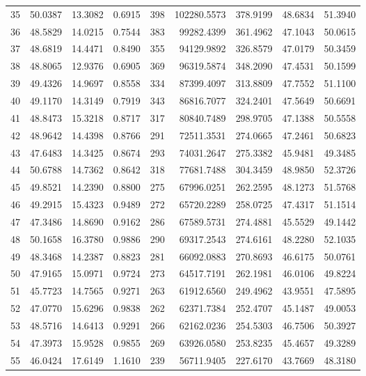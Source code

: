 \begin{longtable}{rrrrrrrrr}
35 & 50.0387 & 13.3082 & 0.6915 & 398 & 102280.5573 & 378.9199 & 48.6834 & 51.3940 \\
36 & 48.5829 & 14.0215 & 0.7544 & 383 & 99282.4399 & 361.4962 & 47.1043 & 50.0615 \\
37 & 48.6819 & 14.4471 & 0.8490 & 355 & 94129.9892 & 326.8579 & 47.0179 & 50.3459 \\
38 & 48.8065 & 12.9376 & 0.6905 & 369 & 96319.5874 & 348.2090 & 47.4531 & 50.1599 \\
39 & 49.4326 & 14.9697 & 0.8558 & 334 & 87399.4097 & 313.8809 & 47.7552 & 51.1100 \\
40 & 49.1170 & 14.3149 & 0.7919 & 343 & 86816.7077 & 324.2401 & 47.5649 & 50.6691 \\
41 & 48.8473 & 15.3218 & 0.8717 & 317 & 80840.7489 & 298.9705 & 47.1388 & 50.5558 \\
42 & 48.9642 & 14.4398 & 0.8766 & 291 & 72511.3531 & 274.0665 & 47.2461 & 50.6823 \\
43 & 47.6483 & 14.3425 & 0.8674 & 293 & 74031.2647 & 275.3382 & 45.9481 & 49.3485 \\
44 & 50.6788 & 14.7362 & 0.8642 & 318 & 77681.7488 & 304.3459 & 48.9850 & 52.3726 \\
45 & 49.8521 & 14.2390 & 0.8800 & 275 & 67996.0251 & 262.2595 & 48.1273 & 51.5768 \\
46 & 49.2915 & 15.4323 & 0.9489 & 272 & 65720.2289 & 258.0725 & 47.4317 & 51.1514 \\
47 & 47.3486 & 14.8690 & 0.9162 & 286 & 67589.5731 & 274.4881 & 45.5529 & 49.1442 \\
48 & 50.1658 & 16.3780 & 0.9886 & 290 & 69317.2543 & 274.6161 & 48.2280 & 52.1035 \\
49 & 48.3468 & 14.2387 & 0.8823 & 281 & 66092.0883 & 270.8693 & 46.6175 & 50.0761 \\
50 & 47.9165 & 15.0971 & 0.9724 & 273 & 64517.7191 & 262.1981 & 46.0106 & 49.8224 \\
51 & 45.7723 & 14.7565 & 0.9271 & 263 & 61912.6560 & 249.4962 & 43.9551 & 47.5895 \\
52 & 47.0770 & 15.6296 & 0.9838 & 262 & 62371.7384 & 252.4707 & 45.1487 & 49.0053 \\
53 & 48.5716 & 14.6413 & 0.9291 & 266 & 62162.0236 & 254.5303 & 46.7506 & 50.3927 \\
54 & 47.3973 & 15.9528 & 0.9855 & 269 & 63926.0580 & 253.8235 & 45.4657 & 49.3289 \\
55 & 46.0424 & 17.6149 & 1.1610 & 239 & 56711.9405 & 227.6170 & 43.7669 & 48.3180 \\

\end{longtable}
